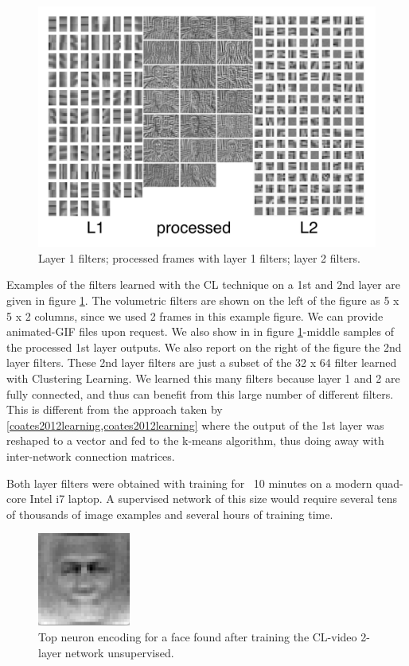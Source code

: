 \documentclass{article} %
\begin{document}
\begin{figure}
\centering
\includegraphics[width=5in]{fig-filtersproc.png}
\caption{Layer 1 filters; processed frames with layer 1 filters; layer 2 filters.}
\label{fig-filterproc}
\end{figure}


Examples of the filters learned with the CL technique on a 1st and 2nd layer are given in figure \ref{fig-filterproc}. The volumetric filters are shown on the left of the figure as 5 x 5 x 2 columns, since we used 2 frames in this example figure. We can provide animated-GIF files upon request. We also show in in figure \ref{fig-filterproc}-middle samples of the processed  1st layer outputs. We also report on the right of the figure the 2nd layer filters. These 2nd layer filters are just a subset of the 32 x 64 filter learned with Clustering Learning. We learned this many filters because layer 1 and 2 are fully connected, and thus can benefit from this large number of different filters. This is different from the approach taken by \ref{coates2012learning,coates2012learning} where the output of the 1st layer was reshaped to a vector and fed to the k-means algorithm, thus doing away with inter-network connection matrices. 

Both layer filters were obtained with training for ~10 minutes on a modern quad-core Intel i7 laptop. A supervised network of this size would require several tens of thousands of image examples and several hours of training time.

\begin{figure}
\includegraphics[width=1.2in]{fig-bestnface.png}
\caption{Top neuron encoding for a face found after training the CL-video 2-layer network unsupervised.}
\label{fig-bestnface}
\end{figure}
\end{document}
